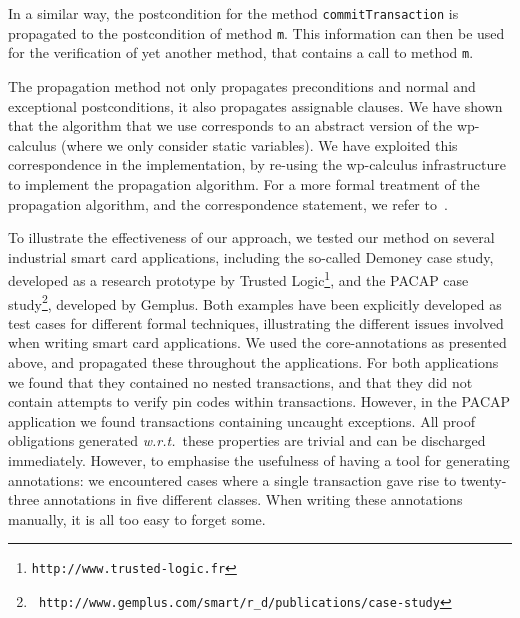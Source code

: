 In a similar way, the postcondition for the method
\texttt{commitTransaction} is propagated to the postcondition of
method \texttt{m}. This information can then be used for the
verification of yet another method, that contains a call to method
\texttt{m}. 

The propagation method not only propagates preconditions and normal
and exceptional postconditions, it also propagates assignable
clauses. We have shown that the algorithm that we use corresponds to
an abstract version of the wp-calculus (where we only consider
static variables). We have exploited this correspondence in the
implementation, by re-using the wp-calculus infrastructure to
implement the propagation algorithm. For a more formal treatment of
the propagation algorithm, and the correspondence statement, we refer
to~\cite{PavlovaBBHL04}.

To illustrate the effectiveness of our approach, we tested our method
on several industrial smart card applications, including the so-called
Demoney case study, developed as a research prototype by Trusted
Logic\footnote{{\tt http://www.trusted-logic.fr}}, and the PACAP case
study\footnote{{\tt
http://www.gemplus.com/smart/r\_d/publications/case-study}}, developed
by Gemplus. Both examples have been explicitly developed as test cases
for different formal techniques, illustrating the different issues
involved when writing smart card applications. We used the
core-annotations as presented above, and propagated these throughout
the applications.  For both applications we found that they contained
no nested transactions, and that they did not contain attempts to
verify pin codes within transactions. However, in the PACAP
application we found transactions containing uncaught exceptions. All
proof obligations generated \emph{w.r.t.}~these properties are trivial
and can be discharged immediately. However, to emphasise the
usefulness of having a tool for generating annotations: we encountered
cases where a single transaction gave rise to twenty-three annotations
in five different classes. When writing these annotations manually, it
is all too easy to forget some.




